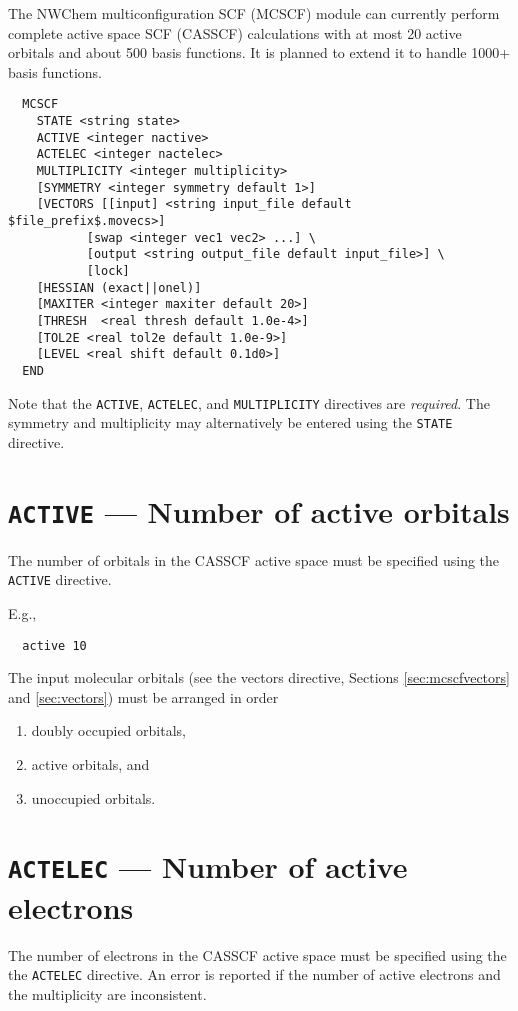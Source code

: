 \label{sec:mcscf}

The NWChem multiconfiguration SCF (MCSCF) module can currently perform
complete active space SCF (CASSCF) calculations with at most 20 active
orbitals and about 500 basis functions.  It is planned to extend it to 
handle 1000+ basis functions.

\begin{verbatim}
  MCSCF
    STATE <string state>
    ACTIVE <integer nactive>
    ACTELEC <integer nactelec>
    MULTIPLICITY <integer multiplicity>
    [SYMMETRY <integer symmetry default 1>]
    [VECTORS [[input] <string input_file default $file_prefix$.movecs>] 
           [swap <integer vec1 vec2> ...] \
           [output <string output_file default input_file>] \
           [lock]
    [HESSIAN (exact||onel)]
    [MAXITER <integer maxiter default 20>]
    [THRESH  <real thresh default 1.0e-4>]
    [TOL2E <real tol2e default 1.0e-9>]
    [LEVEL <real shift default 0.1d0>]
  END
\end{verbatim}
Note that the \verb+ACTIVE+, \verb+ACTELEC+, and \verb+MULTIPLICITY+
directives are {\em required}.  The symmetry and multiplicity may
alternatively be entered using the \verb+STATE+ directive.

\section{{\tt ACTIVE} --- Number of active orbitals}

The number of orbitals in the CASSCF active space must be specified
using the {\tt ACTIVE} directive.

E.g.,
\begin{verbatim}
  active 10
\end{verbatim}

The input molecular orbitals (see the vectors directive, Sections
\ref{sec:mcscfvectors} and \ref{sec:vectors}) must be arranged in
order
\begin{enumerate}
\item doubly occupied orbitals,
\item active orbitals, and
\item unoccupied orbitals.
\end{enumerate}

\section{{\tt ACTELEC} --- Number of active electrons}

The number of electrons in the CASSCF active space must be specified
using the the {\tt ACTELEC} directive.  An error is reported if the
number of active electrons and the multiplicity are inconsistent.

